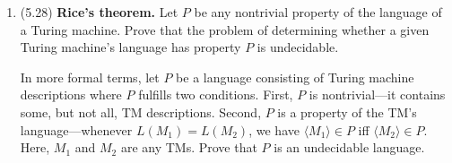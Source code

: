 \documentclass[11pt]{article}
\begin{document}
\assignmentnametitlestuff


\begin{enumerate}


\item (5.28) {\bf Rice's theorem.} Let $P$ be any nontrivial property of the language of a Turing machine. Prove that the problem of determining whether a given Turing machine's language has property $P$ is undecidable.

In more formal terms, let $P$ be a language consisting of Turing machine descriptions where $P$ fulfills two conditions. First, $P$ is nontrivial---it contains some, but not all, TM descriptions. Second, $P$ is a property of the TM's language---whenever $L(M_1) = L(M_2)$, we have $\langle M_1 \rangle \in P$ iff $\langle M_2 \rangle \in P$. Here, $M_1$ and $M_2$ are any TMs. Prove that $P$ is an undecidable language.


\end{enumerate}
\end{document}
